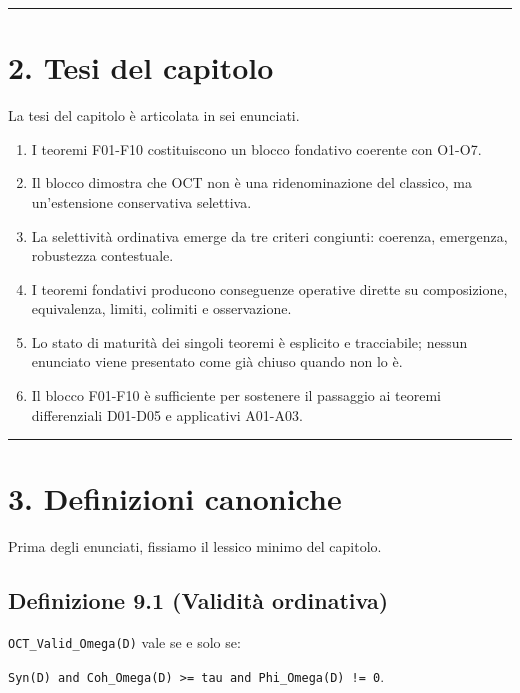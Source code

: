 \begin{center}\rule{0.5\linewidth}{0.5pt}\end{center}

\section{2. Tesi del capitolo}

La tesi del capitolo è articolata in sei enunciati.

\begin{enumerate}
\def\labelenumi{\arabic{enumi}.}
\tightlist
\item
  I teoremi F01-F10 costituiscono un blocco fondativo coerente con O1-O7.
\item
  Il blocco dimostra che OCT non è una ridenominazione del classico, ma un'estensione conservativa selettiva.
\item
  La selettività ordinativa emerge da tre criteri congiunti: coerenza, emergenza, robustezza contestuale.
\item
  I teoremi fondativi producono conseguenze operative dirette su composizione, equivalenza, limiti, colimiti e osservazione.
\item
  Lo stato di maturità dei singoli teoremi è esplicito e tracciabile; nessun enunciato viene presentato come già chiuso quando non lo è.
\item
  Il blocco F01-F10 è sufficiente per sostenere il passaggio ai teoremi differenziali D01-D05 e applicativi A01-A03.
\end{enumerate}

\begin{center}\rule{0.5\linewidth}{0.5pt}\end{center}

\section{3. Definizioni canoniche}

Prima degli enunciati, fissiamo il lessico minimo del capitolo.

\subsection{Definizione 9.1 (Validità ordinativa)}

\texttt{OCT\_Valid\_Omega(D)} vale se e solo se:

\texttt{Syn(D)\ and\ Coh\_Omega(D)\ \textgreater{}=\ tau\ and\ Phi\_Omega(D)\ !=\ 0}.

